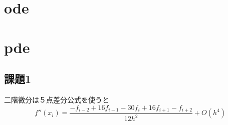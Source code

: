 \documentclass{jsarticle}
\date{\today}
\author{山田龍}
\title{}
\begin{document}
\maketitle
\section{ode}
\section{pde}
\subsection{課題1}
二階微分は５点差分公式を使うと
\begin{equation}
    f''(x_i) = \frac{-f_{i-2}+16f_{i-1}-30f_{i}+16f_{i+1}-f_{i+2}}{12h^2} + O(h^4)
\end{equation}



\end{document}

